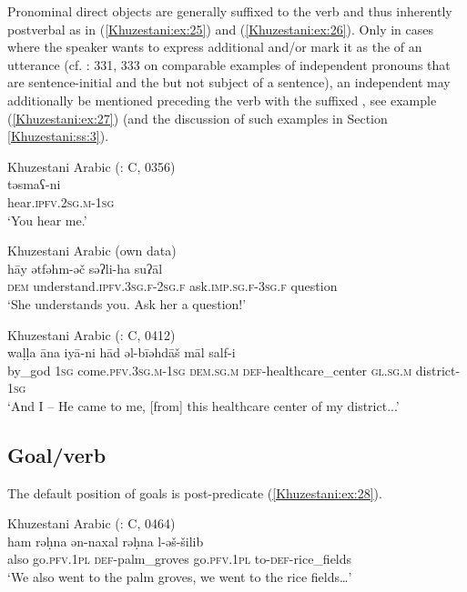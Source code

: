 \documentclass[output=paper,colorlinks,citecolor=brown,draftmode]{langscibook}
\begin{document}
Pronominal direct objects are generally suffixed to the verb and thus inherently postverbal as in (\ref{Khuzestani:ex:25}) and (\ref{Khuzestani:ex:26}). Only in cases where the speaker wants to express additional  and/or mark it as the  of an utterance (cf. \citealt{brustad2000}: 331, 333 on comparable examples of independent pronouns that are sentence-initial and the  but not subject of a sentence), an independent  may additionally be mentioned preceding the verb with the suffixed , see example (\ref{Khuzestani:ex:27}) (and the discussion of such examples in Section \ref{Khuzestani:ss:3}). 

\ea\label{Khuzestani:ex:25}
Khuzestani Arabic (\citealt{leitnerArabic2021}: C, 0356) \\
\gll təsmaʕ-ni \\
hear\textsc{.ipfv.2sg.m-1sg} \\
\glt `You hear me.' 
\z

\ea\label{Khuzestani:ex:26}
Khuzestani Arabic (own data) \\
\gll hāy ətfəhm-əč səʔli-ha suʔāl \\
\textsc{dem} understand\textsc{.ipfv.3sg.f-2sg.f} ask\textsc{.imp.sg.f-3sg.f} question \\
\glt `She understands you. Ask her a question!' 
\z

\ea\label{Khuzestani:ex:27}
Khuzestani Arabic (\citealt{leitnerArabic2021}: C, 0412) \\
\gll waḷḷa āna iyā-ni hād əl-bīəhdāš{\footnotemark} māl salf-i \\
by\_god \textsc{1sg} come\textsc{.pfv.3sg.m-1sg} \textsc{dem.sg.m} \textsc{def-}healthcare\_center \textsc{gl.sg.m} district\textsc{-1sg} \\
\glt `And I – He came to me, [from] this healthcare center of my district...' 
\z


\subsection{Goal/verb}\label{Khuzestani:ss:2.10}

The default position of goals is post-predicate (\ref{Khuzestani:ex:28}).

\ea\label{Khuzestani:ex:28}
Khuzestani Arabic (\citealt{leitnerArabic2021}: C, 0464) \\
\gll ham rəḥna ən-naxal rəḥna l-əš-šilib \\
also go\textsc{.pfv.1pl} \textsc{def-}palm\_groves go\textsc{.pfv.1pl} to\textsc{-def-}rice\_fields \\
\glt `We also went to the palm groves, we went to the rice fields…' 
\z
\end{document}
